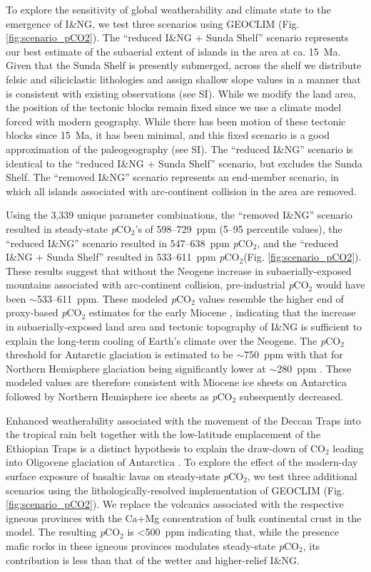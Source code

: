 \documentclass[11pt,letterpaper]{article}
\newcommand{\pCOtwo}{\textit{p}CO$_{2}$\xspace}
\newcommand{\COtwo}{CO$_{2}$\xspace}
\begin{document}
To explore the sensitivity of global weatherability and climate state to the emergence of I\&NG, we test three scenarios using GEOCLIM (Fig. \ref{fig:scenario_pCO2}). The ``reduced I\&NG + Sunda Shelf'' scenario represents our best estimate of the subaerial extent of islands in the area at ca. 15~Ma. Given that the Sunda Shelf is presently submerged, across the shelf we distribute felsic and siliciclastic lithologies and assign shallow slope values in a manner that is consistent with existing observations (see SI). While we modify the land area, the position of the tectonic blocks remain fixed since we use a climate model forced with modern geography. While there has been motion of these tectonic blocks since 15~Ma, it has been minimal, and this fixed scenario is a good approximation of the paleogeography (see SI). The ``reduced I\&NG'' scenario is identical to the ``reduced I\&NG + Sunda Shelf'' scenario, but excludes the Sunda Shelf. The ``removed I\&NG'' scenario represents an end-member scenario, in which all islands associated with arc-continent collision in the area are removed.

Using the 3,339 unique parameter combinations, the ``removed I\&NG'' scenario resulted in steady-state \pCOtwo's of 598--729~ppm (5--95 percentile values), the ``reduced I\&NG'' scenario resulted in 547--638~ppm \pCOtwo, and the ``reduced I\&NG + Sunda Shelf'' resulted in 533--611~ppm \pCOtwo (Fig. \ref{fig:scenario_pCO2}). These results suggest that without the Neogene increase in subaerially-exposed mountains associated with arc-continent collision, pre-industrial \pCOtwo would have been $\sim$533--611~ppm. These modeled \pCOtwo values resemble the higher end of proxy-based \pCOtwo estimates for the early Miocene \cite{Foster2017a}, indicating that the increase in subaerially-exposed land area and tectonic topography of I\&NG is sufficient to explain the long-term cooling of Earth's climate over the Neogene. The \pCOtwo threshold for Antarctic glaciation is estimated to be $\sim$750~ppm with that for Northern Hemisphere glaciation being significantly lower at $\sim$280~ppm \cite{DeConto2008a}. These modeled values are therefore consistent with Miocene ice sheets on Antarctica followed by Northern Hemisphere ice sheets as \pCOtwo subsequently decreased. 

Enhanced weatherability associated with the movement of the Deccan Traps into the tropical rain belt together with the low-latitude emplacement of the Ethiopian Traps is a distinct hypothesis to explain the draw-down of \COtwo leading into Oligocene glaciation of Antarctica \cite{Kent2008a, Kent2013a}. To explore the effect of the modern-day surface exposure of basaltic lavas on steady-state \pCOtwo, we test three additional scenarios using the lithologically-resolved implementation of GEOCLIM (Fig. \ref{fig:scenario_pCO2}). We replace the  volcanics associated with the respective igneous provinces with the Ca+Mg concentration of bulk continental crust in the model. The resulting  \pCOtwo is \textless500~ppm indicating that, while the presence mafic rocks in these igneous provinces modulates steady-state \pCOtwo, its contribution is less than that of the wetter and higher-relief I\&NG.
\end{document}
